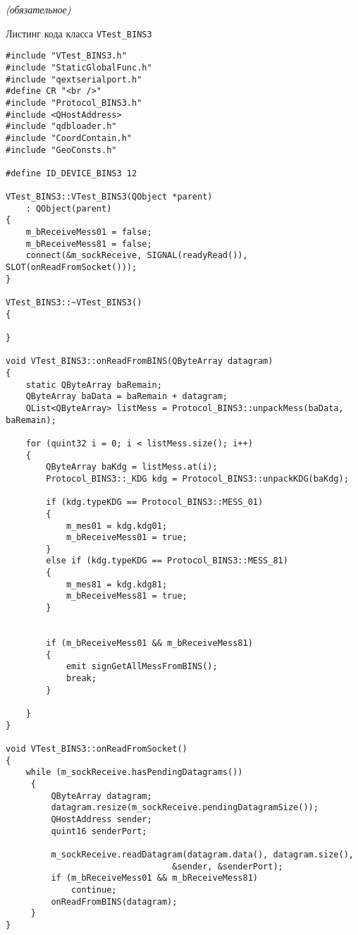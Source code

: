 \label{sec:appendix_b}


\begin{center}
	\normalfont\normalsize{\textit{(обязательное)}}

	\normalfont\normalsize{Листинг кода класса \texttt{VTest\_BINS3}}
\end{center}

\begin{verbatim}
#include "VTest_BINS3.h"
#include "StaticGlobalFunc.h"
#include "qextserialport.h"
#define CR "<br />"
#include "Protocol_BINS3.h"
#include <QHostAddress>
#include "qdbloader.h"
#include "CoordContain.h"
#include "GeoConsts.h"

#define ID_DEVICE_BINS3 12

VTest_BINS3::VTest_BINS3(QObject *parent)
	: QObject(parent)
{
	m_bReceiveMess01 = false;
	m_bReceiveMess81 = false;
	connect(&m_sockReceive, SIGNAL(readyRead()), SLOT(onReadFromSocket()));
}

VTest_BINS3::~VTest_BINS3()
{

}

void VTest_BINS3::onReadFromBINS(QByteArray datagram)
{
	static QByteArray baRemain;
	QByteArray baData = baRemain + datagram;
	QList<QByteArray> listMess = Protocol_BINS3::unpackMess(baData, baRemain);

	for (quint32 i = 0; i < listMess.size(); i++)
	{
		QByteArray baKdg = listMess.at(i);
		Protocol_BINS3::_KDG kdg = Protocol_BINS3::unpackKDG(baKdg);

		if (kdg.typeKDG == Protocol_BINS3::MESS_01)
		{
			m_mes01 = kdg.kdg01;
			m_bReceiveMess01 = true;
		}
		else if (kdg.typeKDG == Protocol_BINS3::MESS_81)
		{
			m_mes81 = kdg.kdg81;
			m_bReceiveMess81 = true;
		}


		if (m_bReceiveMess01 && m_bReceiveMess81)
		{
			emit signGetAllMessFromBINS();
			break;
		}

	}
}

void VTest_BINS3::onReadFromSocket()
{
	while (m_sockReceive.hasPendingDatagrams())
	 {
         QByteArray datagram;
         datagram.resize(m_sockReceive.pendingDatagramSize());
         QHostAddress sender;
         quint16 senderPort;

         m_sockReceive.readDatagram(datagram.data(), datagram.size(),
                                 &sender, &senderPort);
		 if (m_bReceiveMess01 && m_bReceiveMess81)
			 continue;
		 onReadFromBINS(datagram);
     }
}



\end{verbatim}
